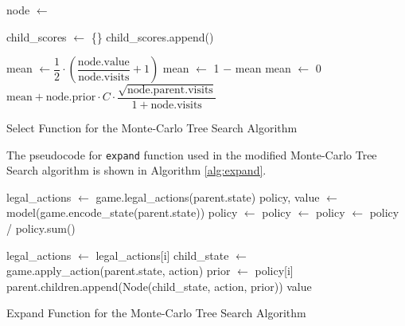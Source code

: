 \begin{algorithm}[htb]
    \begin{algorithmic}[1]
                \State node $\gets$ 
            \EndWhile
        \EndFunction
        
            \State child\_scores $\gets$ \{\}
                \State child\_scores.append()
            \EndFor
            \Return {}
        \EndFunction
        
                \State mean $\gets \dfrac{1}{2}\cdot\left(\dfrac{ \text{node.value} }{ \text{node.visits} } + 1\right)$
                    \State mean $\gets$ 1 $-$ mean
                \EndIf
            \Else
                \State mean $\gets$ 0
            \EndIf
            \State \Return $\text{mean} + \text{node.prior} \cdot C \cdot \dfrac{\sqrt{\text{node.parent.visits}}}{1 + \text{node.visits}}$  
        \EndFunction
    \end{algorithmic}
    \caption{Select Function for the Monte-Carlo Tree Search Algorithm}
    \label{alg:select}
\end{algorithm}

The pseudocode for \verb|expand| function used in the modified Monte-Carlo Tree Search algorithm is shown in Algorithm \ref{alg:expand}.

\begin{algorithm}[htb]
    \begin{algorithmic}[1]
            \State legal\_actions $\gets$ game.legal\_actions(parent.state)
            \State policy, value $\gets$ model(game.encode\_state(parent.state))
            \State policy $\gets$ 
            \State policy $\gets$ 
            \State policy $\gets$ policy / policy.sum()
        
                \State legal\_actions $\gets$ legal\_actions[i]
                \State child\_state $\gets$ game.apply\_action(parent.state, action)
                \State prior $\gets$ policy[i]
                \State parent.children.append(Node(child\_state, action, prior))
            \EndFor
            \State \Return value
        \EndFunction
    \end{algorithmic}
    \caption{Expand Function for the Monte-Carlo Tree Search Algorithm}
    \label{alg:expand}
\end{algorithm}

